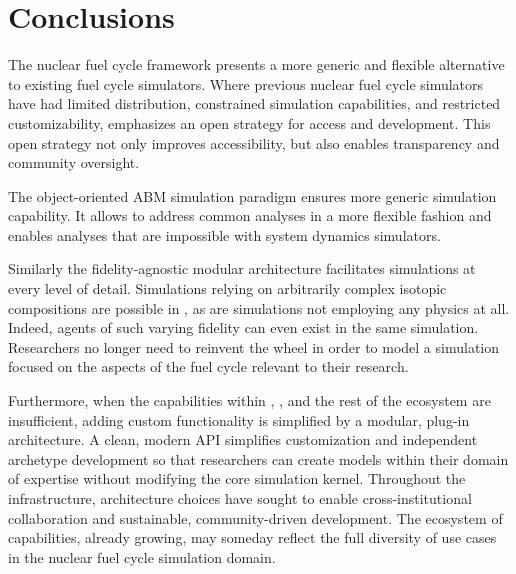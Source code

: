 

\section{Conclusions}


The \Cyclus nuclear fuel cycle framework presents a more generic and flexible
alternative to existing fuel cycle simulators. Where previous nuclear fuel
cycle simulators have had limited distribution, constrained simulation
capabilities, and restricted customizability, \Cyclus emphasizes an open
strategy for access and development.  This open strategy not only improves
accessibility, but also enables transparency and community oversight.

The object-oriented \gls{ABM} simulation paradigm ensures more generic
simulation capability. It allows \Cyclus to address common analyses in a more
flexible fashion and enables analyses that are impossible with system dynamics
simulators.

Similarly the fidelity-agnostic modular architecture facilitates simulations
at every level of detail. Simulations relying on arbitrarily complex isotopic
compositions are possible in \Cyclus, as are simulations not employing any
physics at all. Indeed, agents of such varying fidelity can even exist in the
same simulation. Researchers no longer need to reinvent the wheel in order to
model a simulation focused on the aspects of the fuel cycle
relevant to their research.

Furthermore, when the capabilities within \Cyclus, \Cycamore, and the rest of
the ecosystem are insufficient, adding custom functionality is simplified by a
modular, plug-in architecture. A clean, modern \gls{API} simplifies
customization and independent archetype development so that researchers can
create models within their domain of expertise without modifying the core
simulation kernel. Throughout the \Cyclus
infrastructure, architecture choices have sought to enable cross-institutional
collaboration and sustainable, community-driven development. The ecosystem
of capabilities, already growing, may someday reflect the full diversity of use
cases in the nuclear fuel cycle simulation domain.


